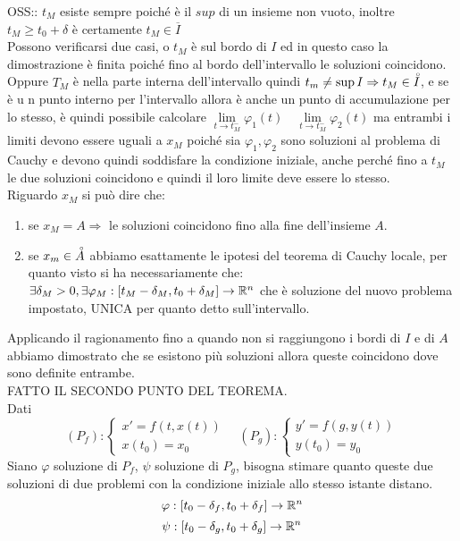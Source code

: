 	OSS:: $t_M$ esiste sempre poiché è il $sup$ di un insieme non vuoto, inoltre $t_M\ge t_0+\delta$ è certamente $t_M\in \overline{I}$\\
	Possono verificarsi due casi, o $t_M$ è sul bordo di $I$ ed in questo caso la dimostrazione è finita poiché fino al bordo dell'intervallo le soluzioni coincidono.
	Oppure $T_M$ è nella parte interna dell'intervallo quindi $t_m\ne\sup I\Rightarrow t_M\in\accentset{\circ}{I}$, e se è u n punto interno per l'intervallo allora è anche un punto di accumulazione per lo stesso, è quindi possibile calcolare $\lim\limits_{t\to t_M^{-}}\varphi_1(t)\quad\lim\limits_{t\to t_M^{-}}\varphi_2(t)$ ma entrambi i limiti devono essere uguali a $x_M$ poiché sia $\varphi_1,\varphi_2$ sono soluzioni al problema  di Cauchy e devono quindi soddisfare la condizione iniziale, anche perché fino a $t_M$ le due soluzioni coincidono e quindi il loro limite deve essere lo stesso.\\
	Riguardo $x_M$ si può dire che:
	\begin{enumerate}
		\item se $x_M = A\Rightarrow$ le soluzioni coincidono fino alla fine dell'insieme $A$.
		\item se $x_m\in\accentset{\circ}{A}$ abbiamo esattamente le ipotesi del teorema di Cauchy locale, per quanto visto si ha necessariamente che:\\
		$\exists \delta_M>0,\exists \varphi_M:\left[t_M-\delta_M,t_0+\delta_M\right]\to \mathbb{R}^n$ che è soluzione del nuovo problema impostato, UNICA per quanto detto sull'intervallo.
	\end{enumerate} 
	Applicando il ragionamento fino a quando non si raggiungono i bordi di $I$ e di $A$ abbiamo dimostrato che se esistono più soluzioni allora queste coincidono dove sono definite entrambe.\\
	FATTO IL SECONDO PUNTO DEL TEOREMA.\\
	Dati
	$$(P_f):\left\{\begin{matrix} x'=f(t,x(t))\\x(t_0)=x_{0}\end{matrix}\right.\quad	(P_g):\left\{\begin{matrix} y'=f(g,y(t))\\y(t_0)=y_{0}\end{matrix}\right.$$
	Siano $\varphi$ soluzione di $P_f$, $\psi$ soluzione di $P_g$, bisogna stimare quanto queste due soluzioni di due problemi con la condizione iniziale allo stesso istante distano.
	$$\varphi:\left[t_0-\delta_f,t_0+\delta_f\right]\to \mathbb{R}^n$$
	$$\psi:\left[t_0-\delta_g,t_0+\delta_g\right]\to \mathbb{R}^n$$
